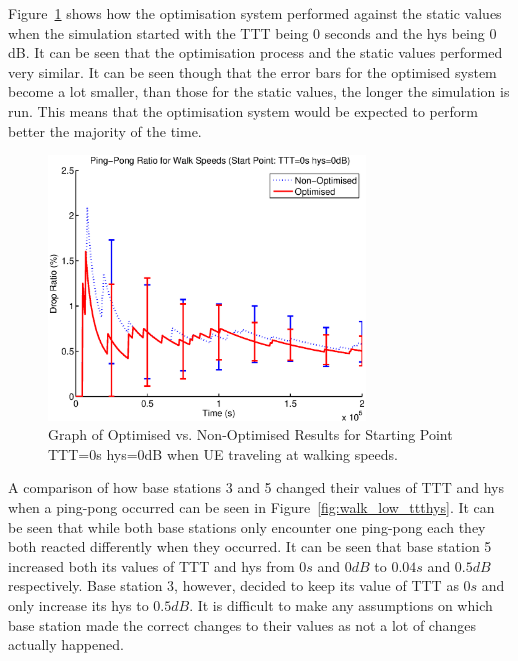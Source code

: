 Figure~\ref{fig:walk_low_ping} shows how the optimisation system performed against the static values when the simulation started with the TTT being 0 seconds and the hys being 0 dB. It can be seen that the optimisation process and the static values performed very similar. It can be seen though that the error bars for the optimised system become a lot smaller, than those for the static values, the longer the simulation is run. This means that the optimisation system would be expected to perform better the majority of the time.
\begin{figure}[H]
  \begin{center}
    	  \includegraphics[width=0.75\textwidth]{figures/walking_figures/walklow.eps}
    \end{center}
    \caption{Graph of Optimised vs. Non-Optimised Results for Starting Point TTT=0s hys=0dB when UE traveling at walking speeds.}
    \label{fig:walk_low_ping}
\end{figure}
A comparison of how base stations 3 and 5 changed their values of TTT and hys when a ping-pong occurred can be seen in Figure~\ref{fig:walk_low_ttthys}. It can be seen that while both base stations only encounter one ping-pong each they both reacted differently when they occurred. It can be seen that base station 5 increased both its values of TTT and hys from $0 s$ and $0 dB$ to $0.04 s$ and $0.5 dB$ respectively.  Base station 3, however, decided to keep its value of TTT as $0 s$ and only increase its hys to $0.5 dB$. It is difficult to make any assumptions on which base station made the correct changes to their values as not a lot of changes actually happened.
